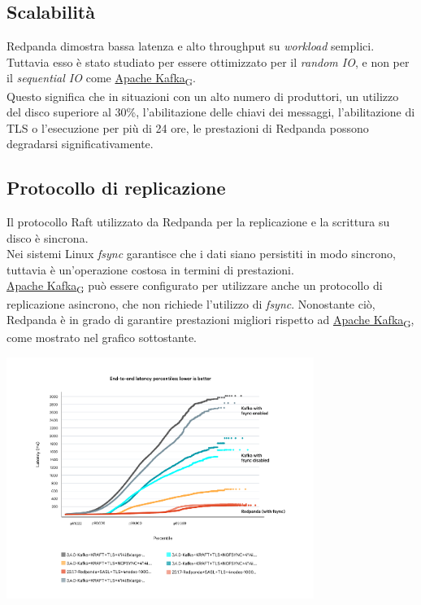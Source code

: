 \subsection{Scalabilità}
Redpanda dimostra bassa latenza e alto throughput su \textit{workload} semplici. Tuttavia esso è stato studiato per essere ottimizzato per il \textit{random IO}, e non per il \textit{sequential IO} come \href{https://7last.github.io/docs/rtb/documentazione-interna/glossario\#apache-kafka}{Apache Kafka\textsubscript{G}}.\\
Questo significa che in situazioni con un alto numero di produttori, un utilizzo del disco superiore al 30\%, l'abilitazione delle chiavi dei messaggi, l'abilitazione di TLS o l'esecuzione per più di 24 ore,
le prestazioni di Redpanda possono degradarsi significativamente.\\

\subsection{Protocollo di replicazione}
Il protocollo Raft utilizzato da Redpanda per la replicazione e la scrittura su disco è sincrona. \\
Nei sistemi Linux \textit{fsync} garantisce che i dati siano persistiti in modo sincrono, tuttavia
è un'operazione costosa in termini di prestazioni.\\
\href{https://7last.github.io/docs/rtb/documentazione-interna/glossario\#apache-kafka}{Apache Kafka\textsubscript{G}} può essere configurato per utilizzare anche un protocollo di replicazione asincrono, che non richiede l'utilizzo di \textit{fsync}.
Nonostante ciò, Redpanda è in grado di garantire prestazioni migliori rispetto ad \href{https://7last.github.io/docs/rtb/documentazione-interna/glossario\#apache-kafka}{Apache Kafka\textsubscript{G}}, come mostrato nel grafico sottostante.

\begin{center}
	\includegraphics[width=0.75\textwidth]{imgs/fsync.png}
\end{center}




























